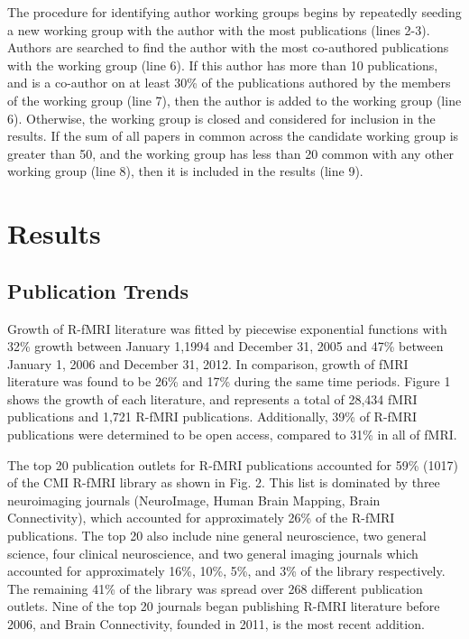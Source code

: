\documentclass[12pt,3p]{elsarticle}
\begin{document}
The procedure for identifying author working groups begins by repeatedly seeding
a new working group with the author with the most publications (lines 2-3).
Authors are searched to find the author with the most co-authored publications
with the working group (line 6). If this author has more than 10 publications,
and is a co-author on at least 30\% of the publications authored by the members
of the working group (line 7), then the author is added to the working group
(line 6). Otherwise, the working group is closed and considered for inclusion in
the results. If the sum of all papers in common across the candidate working
group is greater than 50, and the working group has less than 20%
common with any other working group (line 8), then it is included in the results
(line 9).


\section{Results}

\subsection{Publication Trends}
Growth of R-fMRI literature was fitted by piecewise exponential functions with
32\% growth between January 1,1994 and December 31, 2005 and 47\% between January
1, 2006 and December 31, 2012. In comparison, growth of fMRI literature was
found to be 26\% and 17\% during the same time periods. Figure 1 shows the growth
of each literature, and represents a total of 28,434 fMRI publications and 1,721
R-fMRI publications. Additionally, 39\% of R-fMRI publications were determined to
be open access, compared to 31\% in all of fMRI.

The top 20 publication outlets for R-fMRI publications accounted for 59\% (1017)
of the CMI R-fMRI library as shown in Fig. 2. This list is dominated by three
neuroimaging journals (NeuroImage, Human Brain Mapping, Brain Connectivity),
which accounted for approximately 26\% of the R-fMRI publications. The top 20
also include nine general neuroscience, two general science, four clinical
neuroscience, and two general imaging journals which accounted for approximately
16\%, 10\%, 5\%, and 3\% of the library respectively. The remaining 41\% of the
library was spread over 268 different publication outlets. Nine of the top 20
journals began publishing R-fMRI literature before 2006, and Brain Connectivity,
founded in 2011, is the most recent addition.  
\end{document}
